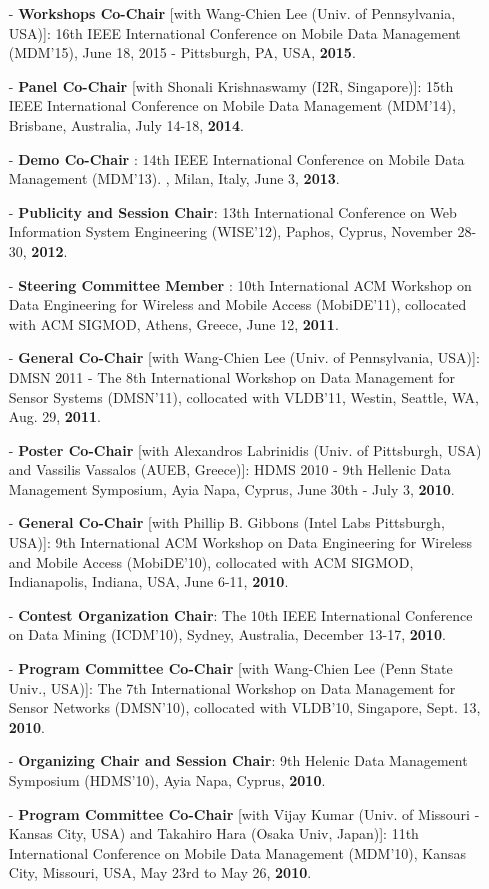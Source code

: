 \documentclass[10pt]{article}
\begin{document}
\begin{itemize}
\begin{itemize}
\item[-] {\bf Workshops Co-Chair} [with  Wang-Chien Lee (Univ. of Pennsylvania, USA)]: 16th IEEE International Conference on Mobile Data Management (MDM'15), June 18, 2015 - Pittsburgh, PA, USA, {\bf 2015}.
\item[-] {\bf Panel Co-Chair} [with  Shonali Krishnaswamy (I2R, Singapore)]: 15th IEEE International Conference on Mobile Data Management (MDM'14), Brisbane, Australia, July 14-18, {\bf 2014}.
\item[-] {\bf Demo Co-Chair} : 14th IEEE International Conference on Mobile Data Management (MDM'13). , Milan, Italy, June 3, {\bf 2013}.
\item[-] {\bf Publicity and Session Chair}: 13th International Conference on Web Information System Engineering (WISE'12), Paphos, Cyprus, November 28-30, {\bf 2012}.
\item[-] {\bf Steering Committee Member} : 10th International ACM Workshop on Data Engineering for Wireless and Mobile Access (MobiDE'11), collocated with ACM SIGMOD, Athens, Greece, June 12, {\bf 2011}.
\item[-] {\bf General Co-Chair} [with  Wang-Chien Lee (Univ. of Pennsylvania, USA)]: DMSN 2011 - The 8th International Workshop on Data Management for Sensor Systems (DMSN'11), collocated with VLDB'11, Westin, Seattle, WA, Aug. 29, {\bf 2011}.
\item[-] {\bf Poster Co-Chair} [with  Alexandros Labrinidis (Univ. of Pittsburgh, USA) and Vassilis Vassalos (AUEB, Greece)]: HDMS 2010 - 9th Hellenic Data Management Symposium, Ayia Napa, Cyprus, June 30th - July 3, {\bf 2010}.
\item[-] {\bf General Co-Chair} [with  Phillip B. Gibbons (Intel Labs Pittsburgh, USA)]: 9th International ACM Workshop on Data Engineering for Wireless and Mobile Access (MobiDE'10), collocated with ACM SIGMOD, Indianapolis, Indiana, USA, June 6-11, {\bf 2010}.
\item[-] {\bf Contest Organization Chair}: The 10th IEEE International Conference on Data Mining (ICDM'10), Sydney, Australia, December 13-17, {\bf 2010}.
\item[-] {\bf Program Committee Co-Chair} [with Wang-Chien Lee (Penn State Univ., USA)]: The 7th International Workshop on Data Management for Sensor Networks (DMSN'10), collocated with VLDB'10, Singapore, Sept. 13, {\bf 2010}.
\item[-] {\bf Organizing Chair and Session Chair}: 9th Helenic Data Management Symposium (HDMS'10), Ayia Napa, Cyprus, {\bf 2010}.
\item[-] {\bf Program Committee Co-Chair} [with Vijay Kumar (Univ. of Missouri - Kansas City, USA) and Takahiro Hara (Osaka Univ, Japan)]: 11th International Conference on Mobile Data Management (MDM'10), Kansas City, Missouri, USA, May 23rd to May 26, {\bf 2010}.

\end{itemize}
\end{itemize}
\end{document}
